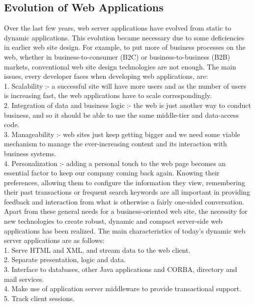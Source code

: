 \documentclass[BTech]{srmuthesis}
\begin{document}
\subsection{Evolution of Web Applications}
Over the last few years, web server applications have evolved from static to dynamic applications. This evolution became necessary due to some deficiencies in earlier web site design. For example, to put more of business processes on the web, whether in business-to-consumer (B2C) or business-to-business (B2B) markets, conventional web site design technologies are not enough. The main issues, every developer faces when developing web applications, are:\\
1. Scalability :- a successful site will have more users and as the number of users is increasing fast, the web applications have to scale correspondingly.\\
2. Integration of data and business logic :- the web is just another way to conduct business, and so it should be able to use the same middle-tier and data-access code. \\
3. Manageability :- web sites just keep getting bigger and we need some viable mechanism to manage the ever-increasing content and its interaction with business systems. \\
4. Personalization :- adding a personal touch to the web page becomes an essential factor to keep our company coming back again. Knowing their preferences, allowing them to configure the information they view, remembering their past transactions or frequent search keywords are all important in providing feedback and interaction from what is otherwise a fairly one-sided conversation.\\
Apart from these general needs for a business-oriented web site, the necessity for new technologies to create robust, dynamic and compact server-side web applications has been realized. The main characteristics of today's dynamic web server applications are as follows: \\
1. Serve HTML and XML, and stream data to the web client. \\
2. Separate presentation, logic and data. \\
3. Interface to databases, other Java applications and CORBA, directory and mail services. \\
4. Make use of application server middleware to provide transactional support. \\
5. Track client sessions.\\
\end{document}
